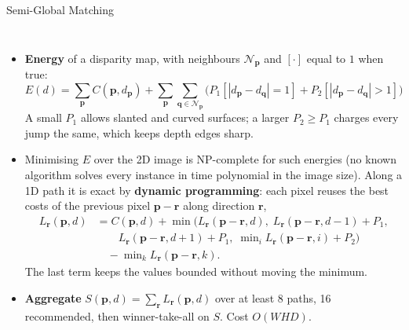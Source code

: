 \begin{frame}{Semi-Global Matching}
  \begin{columns}[T,onlytextwidth]
      \begin{itemize}\scriptsize\itemsep0.12em
        \item \textbf{Energy} of a disparity map, with neighbours $\mathcal{N}_{\mathbf{p}}$ and $[\cdot]$ equal to $1$ when true:
        \[ E(d) = \sum_{\mathbf{p}} C(\mathbf{p},d_{\mathbf{p}}) + \sum_{\mathbf{p}}\sum_{\mathbf{q}\in\mathcal{N}_{\mathbf{p}}} \Big( P_1[|d_{\mathbf{p}}-d_{\mathbf{q}}|=1] + P_2[|d_{\mathbf{p}}-d_{\mathbf{q}}|>1] \Big) \]
        A small $P_1$ allows slanted and curved surfaces; a larger $P_2 \geq P_1$ charges every jump the same, which keeps depth edges sharp.
        \item Minimising $E$ over the 2D image is NP-complete for such energies (no known algorithm solves every instance in time polynomial in the image size). Along a 1D path it is exact by \textbf{dynamic programming}: each pixel reuses the best costs of the previous pixel $\mathbf{p}-\mathbf{r}$ along direction $\mathbf{r}$,
        \[ \begin{aligned} L_{\mathbf{r}}(\mathbf{p},d) &= C(\mathbf{p},d) + \min\big( L_{\mathbf{r}}(\mathbf{p}{-}\mathbf{r},d),\; L_{\mathbf{r}}(\mathbf{p}{-}\mathbf{r},d{-}1){+}P_1,\\ &\qquad L_{\mathbf{r}}(\mathbf{p}{-}\mathbf{r},d{+}1){+}P_1,\; \min\nolimits_i L_{\mathbf{r}}(\mathbf{p}{-}\mathbf{r},i){+}P_2 \big)\\ &\quad - \min\nolimits_k L_{\mathbf{r}}(\mathbf{p}{-}\mathbf{r},k). \end{aligned} \]
        The last term keeps the values bounded without moving the minimum.
        \item \textbf{Aggregate} $S(\mathbf{p},d) = \sum_{\mathbf{r}} L_{\mathbf{r}}(\mathbf{p},d)$ over at least 8 paths, 16 recommended, then winner-take-all on $S$. Cost $O(WHD)$.
      \end{itemize}
      \centering
\end{columns}
\end{frame}
